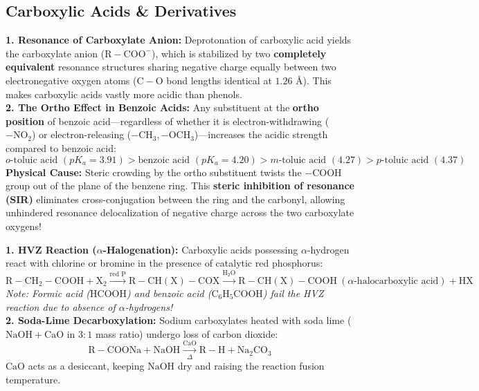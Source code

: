 \documentclass[10pt,a4paper]{article}
\begin{document}
\subsection{Carboxylic Acids \& Derivatives}

\begin{conceptbox}
\textbf{1. Resonance of Carboxylate Anion:}
Deprotonation of carboxylic acid yields the carboxylate anion ($\mathrm{R-COO^-}$), which is stabilized by two \textbf{completely equivalent} resonance structures sharing negative charge equally between two electronegative oxygen atoms ($\mathrm{C-O}$ bond lengths identical at $1.26\text{ \AA}$). This makes carboxylic acids vastly more acidic than phenols.\\
\textbf{2. The Ortho Effect in Benzoic Acids:}
Any substituent at the \textbf{ortho position} of benzoic acid—regardless of whether it is electron-withdrawing ($-\mathrm{NO_2}$) or electron-releasing ($-\mathrm{CH_3}, -\mathrm{OCH_3}$)—increases the acidic strength compared to benzoic acid:
\begin{equation}
  o\text{-toluic acid } (pK_a = 3.91) > \text{benzoic acid } (pK_a = 4.20) > m\text{-toluic acid } (4.27) > p\text{-toluic acid } (4.37)
\end{equation}
\textbf{Physical Cause:} Steric crowding by the ortho substituent twists the $-\mathrm{COOH}$ group out of the plane of the benzene ring. This \textbf{steric inhibition of resonance (SIR)} eliminates cross-conjugation between the ring and the carbonyl, allowing unhindered resonance delocalization of negative charge across the two carboxylate oxygens!
\end{conceptbox}

\begin{formulabox}
\textbf{1. HVZ Reaction ($\alpha$-Halogenation):}
Carboxylic acids possessing $\alpha$-hydrogen react with chlorine or bromine in the presence of catalytic red phosphorus:
\begin{equation}
  \mathrm{R-CH_2-COOH} + \mathrm{X_2} \xrightarrow{\text{red } \mathrm{P}} \mathrm{R-CH(X)-COX} \xrightarrow{\mathrm{H_2O}} \mathbf{\mathrm{R-CH(X)-COOH}} \ (\alpha\text{-halocarboxylic acid}) + \mathrm{HX}
\end{equation}
\textit{Note: Formic acid ($\mathrm{HCOOH}$) and benzoic acid ($\mathrm{C_6H_5COOH}$) fail the HVZ reaction due to absence of $\alpha$-hydrogens!}\\
\textbf{2. Soda-Lime Decarboxylation:}
Sodium carboxylates heated with soda lime ($\mathrm{NaOH} + \mathrm{CaO}$ in $3:1$ mass ratio) undergo loss of carbon dioxide:
\begin{equation}
  \mathrm{R-COONa} + \mathrm{NaOH} \xrightarrow[\Delta]{\mathrm{CaO}} \mathbf{\mathrm{R-H}} + \mathrm{Na_2CO_3}
\end{equation}
$\mathrm{CaO}$ acts as a desiccant, keeping $\mathrm{NaOH}$ dry and raising the reaction fusion temperature.
\end{formulabox}
\end{document}
